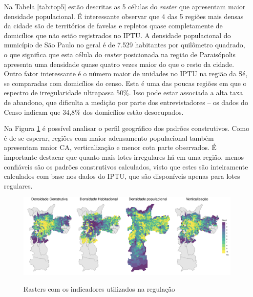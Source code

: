 \begin{table}[h]
    
\end{table}

Na Tabela \ref{tab:top5} estão descritas as 5 células do \textit{raster} que apresentam maior densidade populacional. É interessante observar que 4 das 5 regiões mais densas da cidade são de territórios de favelas e repletos quase completamente de domicílios que não estão registrados no IPTU. A densidade populacional do município de São Paulo no geral é de 7.529 habitantes por quilômetro quadrado, o que significa que esta célula do \textit{raster} posicionada na região de Paraisópolis apresenta uma densidade quase quatro vezes maior do que o resto da cidade. Outro fator interessante é o número maior de unidades no IPTU na região da Sé, se comparadas com domicílios do censo. Esta é uma das poucas regiões em que o espectro de irregularidade ultrapassa 50\%. Isso pode estar associada a alta taxa de abandono, que dificulta a medição por parte dos entrevistadores -- os dados do Censo indicam que 34,8\% dos domicílios estão desocupados.


Na Figura \ref{fig:rasters} é possível analisar o perfil geográfico dos padrões construtivos. Como é de se esperar, regiões com maior adensamento populacional também apresentam maior CA, verticalização e menor cota parte observados. É importante destacar que quanto mais lotes irregulares há em uma região, menos confiáveis são os padrões construtivos calculados, visto que estes são inteiramente calculados com base nos dados do IPTU, que são disponíveis apenas para lotes regulares.

\begin{figure}[h]
    \centering
    \caption{Rasters com os indicadores utilizados na regulação}
    \includegraphics[width = \linewidth]{imagens/rasters_wide.pdf}
    \label{fig:rasters}
\end{figure}

